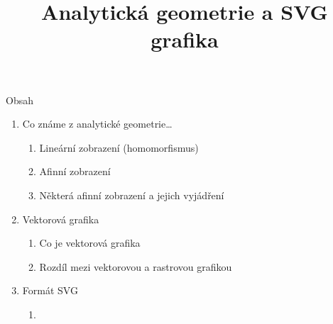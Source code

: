 \documentclass[11pt,aspectratio=169]{beamer}
\title{Analytická geometrie a SVG grafika}
\begin{document}
    \maketitle

    \begin{frame}[t]{Obsah}
        \begin{enumerate}
            \item Co známe z analytické geometrie\dots
            \begin{enumerate}
                \item Lineární zobrazení (homomorfismus)
                \item Afinní zobrazení
                \item Některá afinní zobrazení a jejich vyjádření
            \end{enumerate}
            \item Vektorová grafika
            \begin{enumerate}
                \item Co je vektorová grafika
                \item Rozdíl mezi vektorovou a rastrovou grafikou
            \end{enumerate}
            \item Formát SVG
            \begin{enumerate}
                \item {}
            \end{enumerate}
        \end{enumerate}
    \end{frame}
\end{document}

